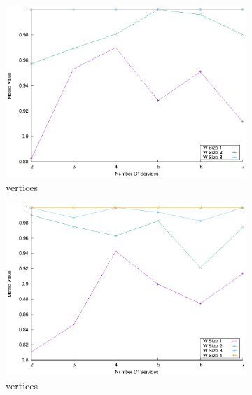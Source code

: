 \begin{figure}[!htb]
  \centering
  \begin{subfigure}{0.48\textwidth}
    \includegraphics[width=\textwidth]{Images/graphs/window_quality_performance_diff_perce_n7_s7_20_100_n3}
    \caption{ vertices}
    \label{fig:quality_window_perce_wide_3n}
  \end{subfigure}
  \hfill
  \begin{subfigure}{0.48\textwidth}
    \includegraphics[width=\textwidth]{Images/graphs/window_quality_performance_diff_perce_n7_s7_20_100_n4}
    \caption{ vertices}
    \label{fig:quality_window_perce_wide_4n}
  \end{subfigure}
  \hfill
  \begin{subfigure}{0.48\textwidth}

\end{subfigure}
\end{figure}
